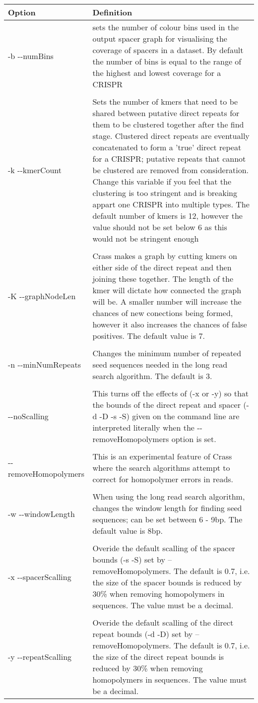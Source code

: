 \documentclass[11pt]{article} %
\begin{document}
    \begin{longtable}{  l   p{10cm} }
    \hline
    Option & Definition \\  \hline\hline 
-b -{}-numBins &  sets the number of colour bins used in the output spacer graph for visualising the coverage of spacers in a dataset.  By default the number of bins is equal to the range of the highest and lowest coverage for a CRISPR \\ \\
-k -{}-kmerCount & Sets the number of kmers that need to be shared between putative direct repeats for them to be clustered together after the find stage.  Clustered direct repeats are eventually concatenated to form a 'true' direct repeat for a CRISPR; putative repeats that cannot be clustered are removed from consideration.  Change this variable if you feel that the clustering is too stringent and is breaking appart one CRISPR into multiple types.  The default number of kmers is 12, however the value should not be set below 6 as this would not be stringent enough\\ \\
-K -{}-graphNodeLen & Crass makes a graph by cutting kmers on either side of the direct repeat and then joining these together.  The length of the kmer will dictate how connected the graph will be.  A smaller number will increase the chances of new conections being formed, however it also increases the chances of false positives.  The default value is 7.\\ \\
-n -{}-minNumRepeats & Changes the minimum number of repeated seed sequences needed in the long read search algorithm. The default is 3.\\ \\
-{}-noScalling & This turns off the effects of (-x or -y) so that the bounds of the direct repeat and spacer (-d -D -s -S) given on the command line are interpreted literally when the -{}-removeHomopolymers option is set. \\ \\
-{}-removeHomopolymers & This is an experimental feature of Crass where the search algorithms attempt to correct for homopolymer errors in reads.\\ \\ 
-w -{}-windowLength & When using the long read search algorithm, changes the window length for finding seed sequences; can be set between 6 - 9bp.  The default value is 8bp.\\ \\ 
-x -{}-spacerScalling & Overide the default scalling of the spacer bounds (-s -S) set by --removeHomopolymers.  The default is 0.7, i.e. the size of the spacer bounds is reduced by 30\% when removing homopolymers in sequences.  The value must be a decimal.   \\ \\
-y -{}-repeatScalling & Overide the default scalling of the direct repeat bounds (-d -D) set by --removeHomopolymers.  The default is 0.7, i.e. the size of the direct repeat bounds is reduced by 30\% when removing homopolymers in sequences.  The value must be a decimal.\\ 
\hline
    \end{longtable}
\end{document}
